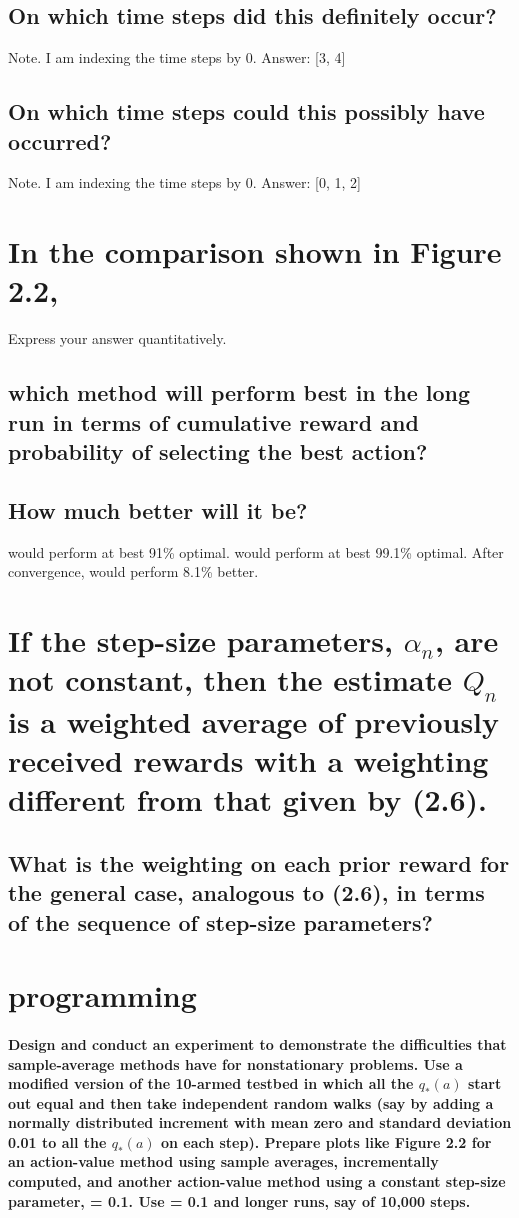 \documentclass{article}
\begin{document}
\subsection{On which time steps did this definitely occur?}
Note. I am indexing the time steps by 0. Answer: [3, 4]
\subsection{On which time steps could this possibly have occurred?}
Note. I am indexing the time steps by 0. Answer: [0, 1, 2]

\section{In the comparison shown in Figure 2.2, }
Express your answer quantitatively.
\subsection{which method will perform best in the long run in terms of cumulative reward and probability
            of selecting the best action?}
\subsection{How much better will it be?}
 would perform at best 91\% optimal.  would perform at best 99.1\% optimal. After convergence,  would perform 8.1\% better.

\section{If the step-size parameters, $\alpha_n$, are not constant, then the estimate $Q_n$ is a weighted average of previously received rewards with a weighting different from that given by (2.6).}
\subsection{What is the weighting on each prior reward for the general case, analogous to (2.6), in terms of the sequence of step-size parameters?}

\section{programming}
\paragraph{Design and conduct an experiment to demonstrate the difficulties that sample-average methods have for nonstationary problems. Use a modified version of the 10-armed testbed in which all the $q_*(a)$ start out equal and then take independent random walks (say by adding a normally distributed increment with mean zero and standard deviation 0.01 to all the $q_*(a)$ on each step). Prepare plots like Figure 2.2 for an action-value method using sample averages, incrementally computed, and another action-value method using a constant step-size parameter, \textalpha \thickspace = 0.1. Use \textepsilon \thickspace = 0.1 and longer runs, say of 10,000 steps.}
\end{document}
